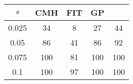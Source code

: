 \centering \begin{tabular}{c|c|c|c|c}
$s$	&CMH	&FIT	&GP	&\sc{Clear} \\\hline
0.025	&34	&8	&27	&44\\
0.05	&86	&41	&86	&92\\
0.075	&100	&81	&100	&100\\
0.1	&100	&97	&100	&100\\
\end{tabular}
